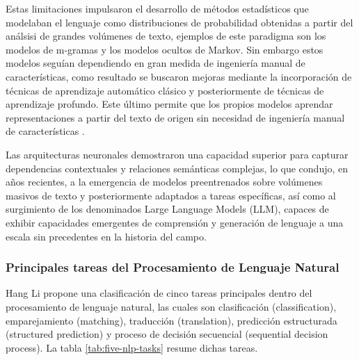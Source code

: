 Estas limitaciones impulsaron el desarrollo de métodos estadísticos que modelaban el lenguaje como distribuciones de probabilidad obtenidas a partir del análsisi de grandes volúmenes de texto, ejemplos de este paradigma son los modelos de m-gramas y los modelos ocultos de Markov. Sin embargo estos modelos seguían dependiendo en gran medida de ingeniería manual de características, como resultado se buscaron mejoras mediante la incorporación de técnicas de aprendizaje automático clásico y posteriormente de técnicas de aprendizaje profundo. Este último permite que los propios modelos aprendar representaciones a partir del texto de origen sin necesidad de ingeniería manual de características \cite{young2018recent}.

 Las arquitecturas neuronales demostraron una capacidad superior para capturar dependencias contextuales y relaciones semánticas complejas, lo que condujo, en años recientes, a la emergencia de modelos preentrenados sobre volúmenes masivos de texto y posteriormente adaptados a tareas específicas, así como al surgimiento de los denominados Large Language Models (LLM), capaces de exhibir capacidades emergentes de comprensión y generación de lenguaje a una escala sin precedentes en la historia del campo.


\subsubsection{Principales tareas del Procesamiento de Lenguaje Natural}

Hang Li \cite{Li2018} propone una clasificación de cinco tareas principales dentro del procesamiento de lenguaje natural, las cuales son clasificación (classification), emparejamiento (matching), traducción (translation), predicción estructurada (structured prediction) y proceso de decisión secuencial (sequential decision process). La  tabla \ref{tab:five-nlp-tasks} resume dichas tareas.

